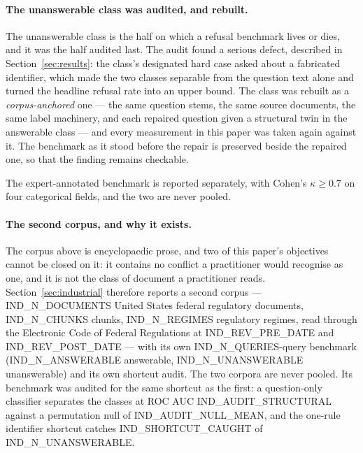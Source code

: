 \documentclass[preprint,3p,times]{elsarticle}
\begin{document}
\paragraph{The unanswerable class was audited, and rebuilt.} The unanswerable
class is the half on which a refusal benchmark lives or dies, and it was the
half audited last. The audit found a serious defect, described in
Section~\ref{sec:results}: the class's designated hard case asked about a
fabricated identifier, which made the two classes separable from the question
text alone and turned the headline refusal rate into an upper bound. The
class was rebuilt as a \emph{corpus-anchored} one --- the same question stems,
the same source documents, the same label machinery, and each repaired
question given a structural twin in the answerable class --- and every
measurement in this paper was taken again against it. The benchmark as it
stood before the repair is preserved beside the repaired one, so that the
finding remains checkable.

The expert-annotated benchmark is reported separately, with Cohen's
$\kappa\geq0.7$ on four categorical fields, and the two are never pooled.

\paragraph{The second corpus, and why it exists.} The corpus above is
encyclopaedic prose, and two of this paper's objectives cannot be closed on
it: it contains no conflict a practitioner would recognise as one, and it is
not the class of document a practitioner reads. Section~\ref{sec:industrial}
therefore reports a second corpus --- {{IND_N_DOCUMENTS}} United States
federal regulatory documents, {{IND_N_CHUNKS}} chunks, {{IND_N_REGIMES}}
regulatory regimes, read through the Electronic Code of Federal Regulations at
{{IND_REV_PRE_DATE}} and {{IND_REV_POST_DATE}} --- with its own
{{IND_N_QUERIES}}-query benchmark ({{IND_N_ANSWERABLE}} answerable,
{{IND_N_UNANSWERABLE}} unanswerable) and its own shortcut audit. The two
corpora are never pooled. Its benchmark was audited for the same shortcut as
the first: a question-only classifier separates the classes at ROC AUC
{{IND_AUDIT_STRUCTURAL}} against a permutation null of
{{IND_AUDIT_NULL_MEAN}}, and the one-rule identifier shortcut catches
{{IND_SHORTCUT_CAUGHT}} of {{IND_N_UNANSWERABLE}}.
\end{document}
